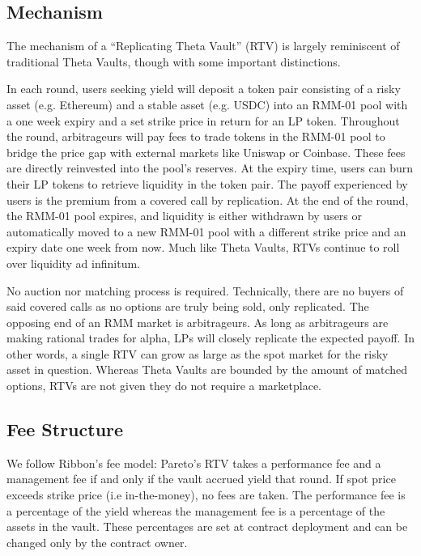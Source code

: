 \documentclass[hidelinks, 12pt]{article}
\begin{document}
\subsection{Mechanism}

The mechanism of a ``Replicating Theta Vault'' (RTV) is largely reminiscent of traditional Theta Vaults, though with some important distinctions.

In each round, users seeking yield will deposit a token pair consisting of a risky asset (e.g. Ethereum) and a stable asset (e.g. USDC) into an RMM-01 pool with a one week expiry and a set strike price in return for an LP token. Throughout the round, arbitrageurs will pay fees to trade tokens in the RMM-01 pool to bridge the price gap with external markets like Uniswap or Coinbase. These fees are directly reinvested into the pool's reserves. At the expiry time, users can burn their LP tokens to retrieve liquidity in the token pair. The payoff experienced by users is the premium from a covered call by replication. At the end of the round, the RMM-01 pool expires, and liquidity is either withdrawn by users or automatically moved to a new RMM-01 pool with a different strike price and an expiry date one week from now. Much like Theta Vaults, RTVs continue to roll over liquidity ad infinitum.

No auction nor matching process is required. Technically, there are no buyers of said covered calls as no options are truly being sold, only replicated. The opposing end of an RMM market is arbitrageurs. As long as arbitrageurs are making rational trades for alpha, LPs will closely replicate the expected payoff. In other words, a single RTV can grow as large as the spot market for the risky asset in question. Whereas Theta Vaults are bounded by the amount of matched options, RTVs are not given they do not require a marketplace.

\subsection{Fee Structure}

We follow Ribbon's fee model: Pareto's RTV takes a performance fee and a management fee if and only if the vault accrued yield that round. If spot price exceeds strike price (i.e in-the-money), no fees are taken. The performance fee is a percentage of the yield whereas the management fee is a percentage of the assets in the vault. These percentages are set at contract deployment and can be changed only by the contract owner.
\end{document}
